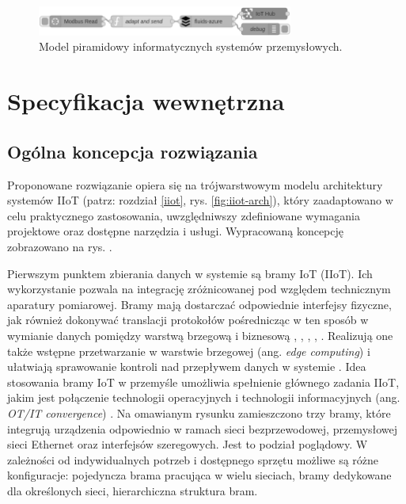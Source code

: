 \documentclass[a4paper, 12pt, twoside]{article}
\begin{document}
\begin{figure}[h]
      \centering
      \includegraphics[width=0.75\textwidth]{flow3.png}
      \caption{Model piramidowy informatycznych systemów przemysłowych.}
      \label{fig:flow3}
\end{figure}



\section{Specyfikacja wewnętrzna}\label{spec-zew}

\subsection{Ogólna koncepcja rozwiązania}\label{ogolna-koncepcja}

Proponowane rozwiązanie opiera się na trójwarstwowym modelu architektury
systemów IIoT (patrz: rozdział \ref{iiot}, rys. \ref{fig:iiot-arch}), który
zaadaptowano w celu praktycznego zastosowania, uwzględniwszy zdefiniowane
wymagania projektowe oraz dostępne narzędzia i usługi. Wypracowaną koncepcję
zobrazowano na rys. .

Pierwszym punktem zbierania danych w systemie
są bramy IoT (IIoT). Ich wykorzystanie
pozwala na integrację zróżnicowanej pod względem technicznym aparatury pomiarowej.
Bramy mają dostarczać odpowiednie interfejsy fizyczne, jak również dokonywać
translacji protokołów pośrednicząc w ten sposób w wymianie danych
pomiędzy warstwą brzegową i biznesową \cite{iiot-gateway-introduction},
\cite{iiot-heterogenous-gateways}, \cite{iot-gateway-medical-and-industrial},
\cite{modbus-iot-gateway}, \cite{iiot-design-and-impl-gateway}. Realizują one także
wstępne przetwarzanie w warstwie brzegowej (ang. \emph{edge computing}) i ułatwiają
sprawowanie kontroli nad przepływem danych w systemie \cite{iiot-architecture-and-gateway}.
Idea stosowania bramy IoT w przemyśle umożliwia
spełnienie głównego zadania IIoT, jakim jest połączenie technologii operacyjnych
i technologii informacyjnych (ang. \emph{OT/IT convergence}) \cite{iiot-opensource-gateway}.
Na omawianym rysunku zamieszczono trzy bramy, które integrują urządzenia odpowiednio
w ramach sieci bezprzewodowej, przemysłowej sieci Ethernet oraz interfejsów szeregowych.
Jest to podział poglądowy. W zależności od indywidualnych potrzeb i dostępnego sprzętu możliwe są różne
konfiguracje: pojedyncza brama pracująca w wielu sieciach, bramy dedykowane
dla określonych sieci, hierarchiczna struktura bram.
\end{document}

